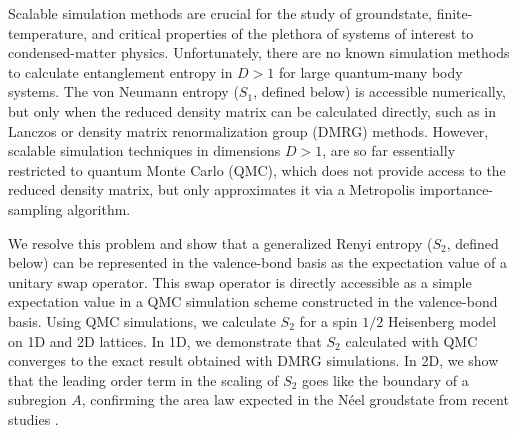 \documentclass[prl,aps,twocolumn,floatfix,amsmath,amssymb,superscriptaddress,tightenlines]{revtex4}
\begin{document}
Scalable simulation methods are crucial for the 
study of groundstate, finite-temperature, and critical properties of the plethora of systems of interest to condensed-matter physics.
Unfortunately, there are 
no known simulation methods to calculate entanglement entropy in $D>1$ for large quantum-many body systems.
The von Neumann entropy ($S_1$, defined below)
is accessible numerically, but only when the reduced density matrix can be calculated directly, such as in Lanczos 
or density matrix renormalization group (DMRG) methods.  However, scalable simulation techniques in dimensions $D>1$,
are so far essentially
restricted to quantum Monte Carlo (QMC), which does not provide access to the reduced density matrix, but only approximates it
via a Metropolis importance-sampling algorithm. 


We resolve this problem and show that a generalized Renyi entropy ($S_2$, defined below) can be represented in the valence-bond basis as the expectation
value of a unitary swap operator.  This swap operator is directly accessible as a simple expectation value in a QMC simulation scheme
constructed in the valence-bond basis.  Using QMC simulations, we calculate $S_2$ for a spin $1/2$ Heisenberg model
on 1D and 2D lattices.  In 1D, we demonstrate that $S_2$ calculated with QMC converges to the exact result obtained with DMRG simulations.  In 2D, we show that the leading order term in the scaling of $S_2$ goes like the boundary of a subregion $A$, 
confirming the area law expected in the N\'eel groudstate from recent studies \cite{Ann}.
\end{document}
